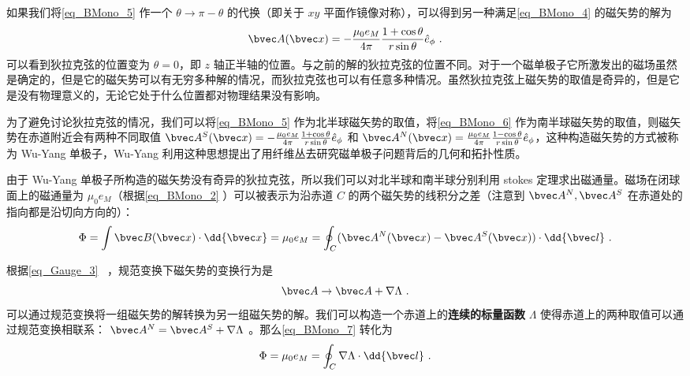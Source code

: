 如果我们将\autoref{eq_BMono_5} 作一个 $\theta\rightarrow \pi-\theta$ 的代换（即关于 $xy$ 平面作镜像对称），可以得到另一种满足\autoref{eq_BMono_4} 的磁矢势的解为
\begin{equation}\label{eq_BMono_6}
\bvec A(\bvec x)=-\frac{\mu_0 e_M}{4\pi}\frac{1+\cos\theta}{r\sin\theta}
\hat e_\phi~.
\end{equation}
可以看到狄拉克弦的位置变为 $\theta=0$，即 $z$ 轴正半轴的位置。与之前的解的狄拉克弦的位置不同。对于一个磁单极子它所激发出的磁场虽然是确定的，但是它的磁矢势可以有无穷多种解的情况，而狄拉克弦也可以有任意多种情况。虽然狄拉克弦上磁矢势的取值是奇异的，但是它是没有物理意义的，无论它处于什么位置都对物理结果没有影响。

为了避免讨论狄拉克弦的情况，我们可以将\autoref{eq_BMono_5} 作为北半球磁矢势的取值，将\autoref{eq_BMono_6} 作为南半球磁矢势的取值，则磁矢势在赤道附近会有两种不同取值 $\bvec A^S(\bvec x)=-\frac{\mu_0 e_M}{4\pi}\frac{1+\cos\theta}{r\sin\theta}
\hat e_\phi$ 和 $\bvec A^N(\bvec x)=\frac{\mu_0 e_M}{4\pi } \frac{1-\cos\theta}{r\sin\theta} \hat e_\phi$，这种构造磁矢势的方式被称为 Wu-Yang 单极子，Wu-Yang 利用这种思想提出了用纤维丛去研究磁单极子问题背后的几何和拓扑性质。

由于 Wu-Yang 单极子所构造的磁矢势没有奇异的狄拉克弦，所以我们可以对北半球和南半球分别利用 stokes 定理求出磁通量。磁场在闭球面上的磁通量为 $\mu_0 e_M$（根据\autoref{eq_BMono_2} ）可以被表示为沿赤道 $C$ 的两个磁矢势的线积分之差（注意到 $\bvec A^N,\bvec A^S$ 在赤道处的指向都是沿切向方向的）：
\begin{equation}\label{eq_BMono_7}
\Phi = \int \bvec B(\bvec x) \cdot \dd{\bvec x} = \mu_0 e_M = \oint_C (\bvec A^N(\bvec x)-\bvec A^S(\bvec x)) \cdot \dd{\bvec l} ~.
\end{equation}

根据\autoref{eq_Gauge_3}~ ，规范变换下磁矢势的变换行为是
\begin{equation}
\bvec A\rightarrow \bvec A+\nabla \Lambda~.
\end{equation}
可以通过规范变换将一组磁矢势的解转换为另一组磁矢势的解。我们可以构造一个赤道上的\textbf{连续的标量函数} $\Lambda$ 使得赤道上的两种取值可以通过规范变换相联系： $\bvec A^N = \bvec A^S + \nabla\Lambda$ 。那么\autoref{eq_BMono_7} 转化为
\begin{equation}\label{eq_BMono_8}
\Phi = \mu_0 e_M = \oint_C \nabla\Lambda \cdot \dd{\bvec l} ~.
\end{equation}


